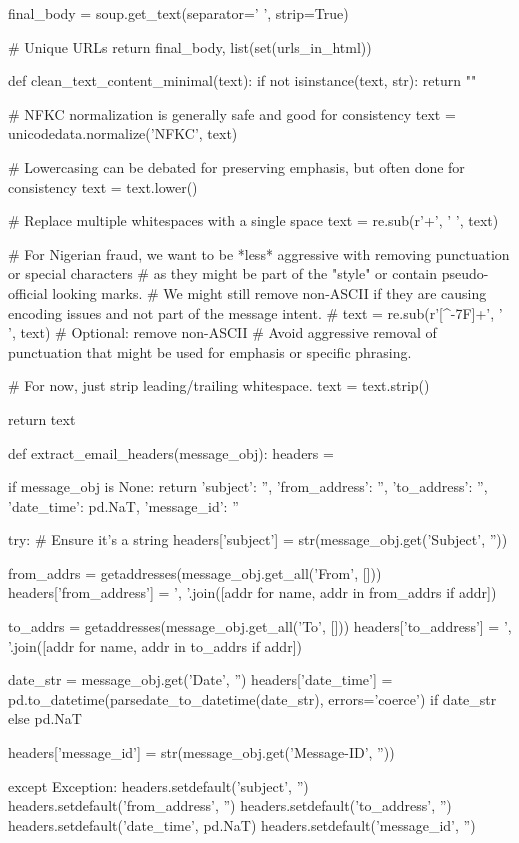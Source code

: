 \begin{ffcode}
    final_body = soup.get_text(separator=' ', strip=True)

# Unique URLs
return final_body, list(set(urls_in_html))

def clean_text_content_minimal(text):
if not isinstance(text, str):
return ""

# NFKC normalization is generally safe and good for consistency
text = unicodedata.normalize('NFKC', text)

# Lowercasing can be debated for preserving emphasis, but often done for consistency
text = text.lower()

# Replace multiple whitespaces with a single space
text = re.sub(r'\s+', ' ', text)

# For Nigerian fraud, we want to be *less* aggressive with removing punctuation or special characters
# as they might be part of the "style" or contain pseudo-official looking marks.
# We might still remove non-ASCII if they are causing encoding issues and not part of the message intent.
# text = re.sub(r'[^-\x7F]+', ' ', text) # Optional: remove non-ASCII
# Avoid aggressive removal of punctuation that might be used for emphasis or specific phrasing.

# For now, just strip leading/trailing whitespace.
text = text.strip()

return text

def extract_email_headers(message_obj):
headers = {}

if message_obj is None:
    return {'subject': '',
            'from_address': '',
            'to_address': '',
            'date_time': pd.NaT,
            'message_id': ''
    }

try:
    # Ensure it's a string
    headers['subject'] = str(message_obj.get('Subject', ''))

    from_addrs = getaddresses(message_obj.get_all('From', []))
    headers['from_address'] = ', '.join([addr for name, addr in from_addrs if addr])

    to_addrs = getaddresses(message_obj.get_all('To', []))
    headers['to_address'] = ', '.join([addr for name, addr in to_addrs if addr])

    date_str = message_obj.get('Date', '')
    headers['date_time'] = pd.to_datetime(parsedate_to_datetime(date_str), errors='coerce') if date_str else pd.NaT

    headers['message_id'] = str(message_obj.get('Message-ID', ''))

except Exception:
    headers.setdefault('subject', '')
    headers.setdefault('from_address', '')
    headers.setdefault('to_address', '')
    headers.setdefault('date_time', pd.NaT)
    headers.setdefault('message_id', '')


\end{ffcode}
